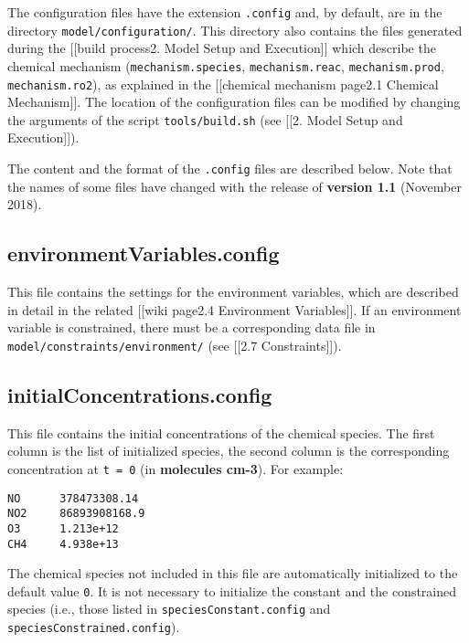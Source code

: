 The configuration files have the extension \texttt{.config} and, by
default, are in the directory \texttt{model/configuration/}. This
directory also contains the files generated during the {[}{[}build
process\textbar{}2. Model Setup and Execution{]}{]} which describe the
chemical mechanism (\texttt{mechanism.species}, \texttt{mechanism.reac},
\texttt{mechanism.prod}, \texttt{mechanism.ro2}), as explained in the
{[}{[}chemical mechanism page\textbar{}2.1 Chemical Mechanism{]}{]}. The
location of the configuration files can be modified by changing the
arguments of the script \texttt{tools/build.sh} (see {[}{[}2. Model
Setup and Execution{]}{]}).

The content and the format of the \texttt{.config} files are described
below. Note that the names of some files have changed with the release
of \textbf{version 1.1} (November 2018).

\subsection{environmentVariables.config} \label{environmentvariables.config}

This file contains the settings for the environment variables, which are
described in detail in the related {[}{[}wiki page\textbar{}2.4
Environment Variables{]}{]}. If an environment variable is constrained,
there must be a corresponding data file in
\texttt{model/constraints/environment/} (see {[}{[}2.7
Constraints{]}{]}).

\subsection{initialConcentrations.config} \label{initialconcentrations.config}

This file contains the initial concentrations of the chemical species.
The first column is the list of initialized species, the second column
is the corresponding concentration at \texttt{t\ =\ 0} (in
\textbf{molecules cm-3}). For example:

\begin{verbatim}
NO      378473308.14
NO2     86893908168.9
O3      1.213e+12
CH4     4.938e+13
\end{verbatim}

The chemical species not included in this file are automatically
initialized to the default value \texttt{0}. It is not necessary to
initialize the constant and the constrained species (i.e., those listed
in \texttt{speciesConstant.config} and
\texttt{speciesConstrained.config}).

